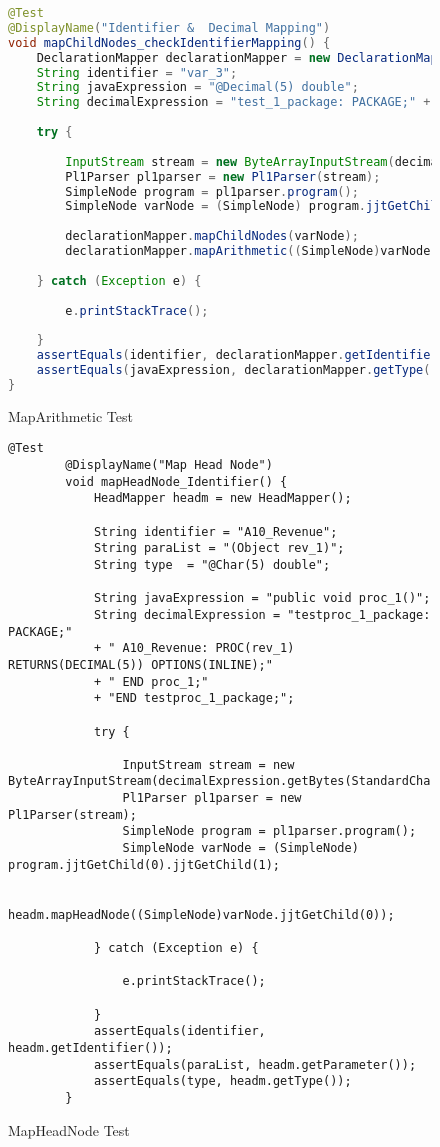 
\begin{figure}[H]\caption{MapArithmetic Test} \label{lst:pliarithmeticexpression_test}
\begin{lstlisting}[language=Java]
@Test
@DisplayName("Identifier &  Decimal Mapping")
void mapChildNodes_checkIdentifierMapping() {
	DeclarationMapper declarationMapper = new DeclarationMapper();
	String identifier = "var_3";
	String javaExpression = "@Decimal(5) double";
	String decimalExpression = "test_1_package: PACKAGE;" + "	DCL var_3 FIXED DECIMAL(5)" + "END test_1_package;";
	
	try {
		
		InputStream stream = new ByteArrayInputStream(decimalExpression.getBytes(StandardCharsets.UTF_8));
		Pl1Parser pl1parser = new Pl1Parser(stream);
		SimpleNode program = pl1parser.program();
		SimpleNode varNode = (SimpleNode) program.jjtGetChild(0).jjtGetChild(1);
		
		declarationMapper.mapChildNodes(varNode);
		declarationMapper.mapArithmetic((SimpleNode)varNode.jjtGetChild(1).jjtGetChild(0));
		
	} catch (Exception e) {
		
		e.printStackTrace();
		
	}
	assertEquals(identifier, declarationMapper.getIdentifier());
	assertEquals(javaExpression, declarationMapper.getType());
}		
\end{lstlisting}
\end{figure}


\begin{figure}[H]\caption{MapHeadNode Test} \label{lst:procchar_test}
	\begin{lstlisting}[language=PL/I]
		@Test
		@DisplayName("Map Head Node")
		void mapHeadNode_Identifier() {
			HeadMapper headm = new HeadMapper();
			
			String identifier = "A10_Revenue";
			String paraList = "(Object rev_1)";
			String type  = "@Char(5) double";
			
			String javaExpression = "public void proc_1()";
			String decimalExpression = "testproc_1_package: PACKAGE;" 
			+ "	A10_Revenue: PROC(rev_1) RETURNS(DECIMAL(5)) OPTIONS(INLINE);"
			+ "	END proc_1;" 
			+ "END testproc_1_package;";
			
			try {
				
				InputStream stream = new ByteArrayInputStream(decimalExpression.getBytes(StandardCharsets.UTF_8));
				Pl1Parser pl1parser = new Pl1Parser(stream);
				SimpleNode program = pl1parser.program();
				SimpleNode varNode = (SimpleNode) program.jjtGetChild(0).jjtGetChild(1);
				
				headm.mapHeadNode((SimpleNode)varNode.jjtGetChild(0));
				
			} catch (Exception e) {
				
				e.printStackTrace();
				
			}
			assertEquals(identifier, headm.getIdentifier());
			assertEquals(paraList, headm.getParameter());
			assertEquals(type, headm.getType());
		}		
	\end{lstlisting}
\end{figure}

